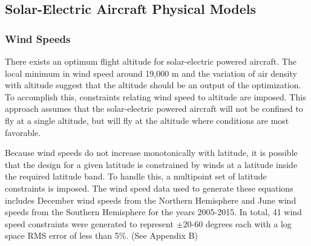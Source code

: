 \subsection{Solar-Electric Aircraft Physical Models}

\subsubsection{Wind Speeds}

There exists an optimum flight altitude for solar-electric powered aircraft.  
The local minimum in wind speed around 19,000 m and the variation of air density with altitude suggest that the altitude should be an output of the optimization. 
To accomplish this, constraints relating wind speed to altitude are imposed. 
This approach assumes that the solar-electric powered aircraft will not be confined to fly at a single altitude, but will fly at the altitude where conditions are most favorable.

Because wind speeds do not increase monotonically with latitude, it is possible that the design for a given latitude is constrained by winds at a latitude inside the required latitude band. 
To handle this, a multipoint set of latitude constraints is imposed. 
The wind speed data used to generate these equations includes December wind speeds from the Northern Hemisphere and June wind speeds from the Southern Hemisphere for the years 2005-2015.
In total, 41 wind speed constraints were generated to represent $\pm$20-60 degrees each with a log space RMS error of less than 5\%. (See Appendix B) 
% 
% 
% 


